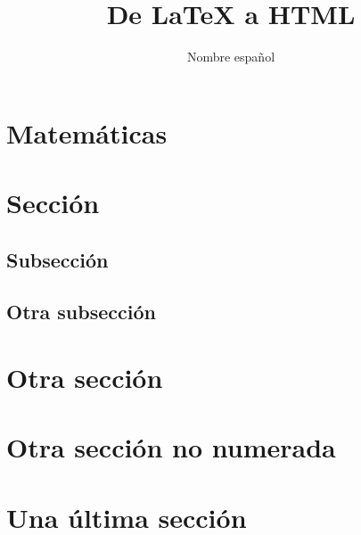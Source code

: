 \documentclass[12pt,a4paper,twoside]{article}
\title{De LaTeX a HTML}
\author{Nombre español}
\begin{document}
\maketitle

\ifdefined\HCode\else
\tableofcontents
\fi


\section{Matemáticas}




\section{Sección}

\lipsum[1-15]

\subsection{Subsección}

\lipsum[1-15]

\subsection{Otra subsección}

\lipsum[1-15]		

\section{Otra sección}

\lipsum[1-15]	

\section*{Otra sección no numerada}

\ifdefined\HCode\else
{}
\fi

\lipsum[1-15]			

\section{Una última sección}

\lipsum[1-15]	
\end{document}
